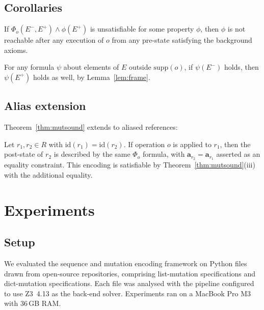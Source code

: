 \documentclass[11pt]{article}
\newcommand{\arrvar}[1]{\mathbf{a}_{#1}}
\newcommand{\prestate}[1]{#1^{-}}
\newcommand{\poststate}[1]{#1^{+}}
\begin{document}
\subsection{Corollaries}

\begin{corollary}\label{cor:unsat}
If $\Phi_o(\prestate{E}, \poststate{E}) \wedge \phi(\poststate{E})$ is
unsatisfiable for some property $\phi$, then $\phi$ is not reachable after
any execution of $o$ from any pre-state satisfying the background axioms.
\end{corollary}

\begin{corollary}\label{cor:frame}
For any formula $\psi$ about elements of $E$ outside $\mathrm{supp}(o)$,
if $\psi(\prestate{E})$ holds, then $\psi(\poststate{E})$ holds as well,
by Lemma~\ref{lem:frame}.
\end{corollary}

\subsection{Alias extension}

Theorem~\ref{thm:mutsound} extends to aliased references:

\begin{theorem}\label{thm:aliassound}
Let $r_1, r_2 \in R$ with $\mathrm{id}(r_1) = \mathrm{id}(r_2)$.
If operation $o$ is applied to $r_1$, then the post-state of $r_2$
is described by the same $\Phi_o$ formula, with $\arrvar{r_2} = \arrvar{r_1}$
asserted as an equality constraint.  This encoding is satisfiable by
Theorem~\ref{thm:mutsound}(iii) with the additional equality.
\end{theorem}

\section{Experiments}\label{sec:eval}

\subsection{Setup}

We evaluated the sequence and mutation encoding framework on \numcases{}
Python files drawn from open-source repositories, comprising \numspec{}
list-mutation specifications and \numeq{} dict-mutation specifications.
Each file was analysed with the \JuGeo{} pipeline configured to use Z3~4.13
as the back-end solver.  Experiments ran on a MacBook Pro M3 with 36\,GB RAM.
\end{document}
